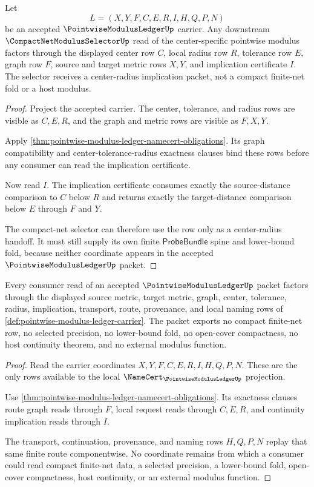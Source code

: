 \begin{theorem}
\label{thm:pointwise-modulus-ledger-center-radius-handoff}
Let
$$
L=(X,Y,F,C,E,R,I,H,Q,P,N)
$$
be an accepted $\PointwiseModulusLedgerUp$ carrier. Any downstream $\CompactNetModulusSelectorUp$ read of the center-specific pointwise modulus factors through the displayed center row $C$, local radius row $R$, tolerance row $E$, graph row $F$, source and target metric rows $X,Y$, and implication certificate $I$. The selector receives a center-radius implication packet, not a compact finite-net fold or a host modulus.
\end{theorem}

\begin{proof}
Project the accepted carrier. The center, tolerance, and radius rows are visible as $C,E,R$, and the graph and metric rows are visible as $F,X,Y$.

Apply \autoref{thm:pointwise-modulus-ledger-namecert-obligations}. Its graph compatibility and center-tolerance-radius exactness clauses bind these rows before any consumer can read the implication certificate.

Now read $I$. The implication certificate consumes exactly the source-distance comparison to $C$ below $R$ and returns exactly the target-distance comparison below $E$ through $F$ and $Y$.

The compact-net selector can therefore use the row only as a center-radius handoff. It must still supply its own finite $\mathsf{ProbeBundle}$ spine and lower-bound fold, because neither coordinate appears in the accepted $\PointwiseModulusLedgerUp$ packet.
\end{proof}

\begin{theorem}
\label{thm:pointwise-modulus-ledger-nonescape}
Every consumer read of an accepted $\PointwiseModulusLedgerUp$ packet factors through the displayed source metric, target metric, graph, center, tolerance, radius, implication, transport, route, provenance, and local naming rows of \autoref{def:pointwise-modulus-ledger-carrier}. The packet exports no compact finite-net row, no selected precision, no lower-bound fold, no open-cover compactness, no host continuity theorem, and no external modulus function.
\end{theorem}

\begin{proof}
Read the carrier coordinates $X,Y,F,C,E,R,I,H,Q,P,N$. These are the only rows available to the local $\NameCert_{\PointwiseModulusLedgerUp}$ projection.

Use \autoref{thm:pointwise-modulus-ledger-namecert-obligations}. Its exactness clauses route graph reads through $F$, local request reads through $C,E,R$, and continuity implication reads through $I$.

The transport, continuation, provenance, and naming rows $H,Q,P,N$ replay that same finite route componentwise. No coordinate remains from which a consumer could read compact finite-net data, a selected precision, a lower-bound fold, open-cover compactness, host continuity, or an external modulus function.
\end{proof}

